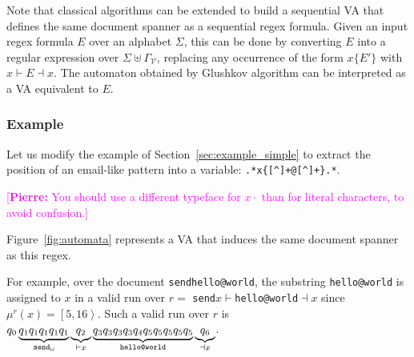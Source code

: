 \documentclass[12px]{article}
\theoremstyle{definition}
\newcommand{\Span}[1]{\left[ #1 \right\rangle}
\newcommand{\pierre}[1]{\textcolor{magenta}{[\textbf{Pierre:} #1]}}
\begin{document}

        Note that classical algorithms can be extended to build a sequential VA
        that defines the same document spanner as a sequential regex formula.
        Given an input regex formula $E$ over an alphabet $\Sigma$, this can be
        done by converting $E$ into a regular expression over $\Sigma \uplus
        \Gamma_\mathcal{V}$, replacing any occurrence of the form $x\{E'\}$
        with $x{\vdash} E {\dashv}x$. The automaton obtained by Glushkov
        algorithm can be interpreted as a VA equivalent to $E$.

      \subsubsection{Example}

        Let us modify the example of Section~\ref{sec:example_simple} to
        extract the position of an email-like pattern into a variable:
        \texttt{.*x\{[\textasciicircum\textvisiblespace]+@[\textasciicircum\textvisiblespace]+\}.*}.

        \pierre{You should use a different typeface for $x{\cdot}$ than
        for literal characters, to avoid confusion.}

        Figure~\ref{fig:automata} represents a VA that induces the same
        document spanner as this regex.

        For example, over the document
        \texttt{send{\textvisiblespace}hello@world}, the substring
        \texttt{hello@world} is assigned to $x$ in a valid run over $r =$
        \texttt{send{\textvisiblespace}$x{\vdash}$hello@world${\dashv}x$} since
        $\mu^r(x) = \Span{5, 16}$. Such a valid run over $r$ is $q_0
        \underbrace{q_1 q_1 q_1 q_1 q_1}_\texttt{send\textvisiblespace}
        \underbrace{q_2}_{{\vdash}x} \underbrace{q_3 q_3 q_3 q_3 q_4 q_5 q_5
        q_5 q_5 q_5}_\texttt{hello@world} \underbrace{q_6}_{{\dashv}x}$.
\end{document}
